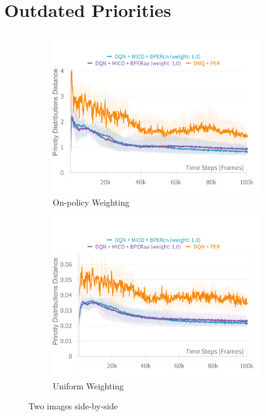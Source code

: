 \section{Outdated Priorities}

\begin{figure}[h]
    \centering
    \begin{subfigure}{0.45\textwidth}
    \includegraphics[width=\linewidth]{Results/grid_world/on_policy_weighting_outdated_priorities.png}
        \caption{On-policy Weighting}
        \label{fig:on_policy_weighting}
    \end{subfigure}
    \hfill
    \begin{subfigure}{0.45\textwidth}
        \includegraphics[width=\linewidth]{Results/grid_world/uniform_weighting_outdated_priorities.png}
        \caption{Uniform Weighting}
        \label{fig:uniform_weighting}
    \end{subfigure}
    \caption{Two images side-by-side}
    \label{fig:outdated_priorities}
\end{figure}



